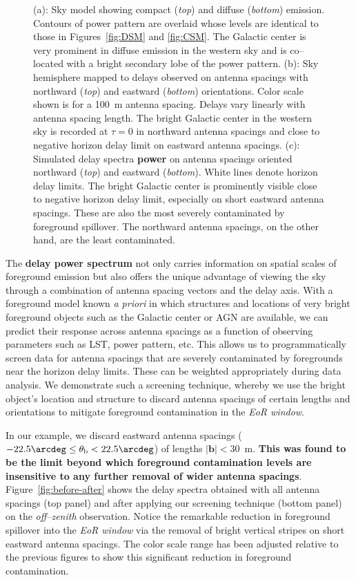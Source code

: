 \documentclass[preprint2,iop,numberedappendix]{emulateapj}
\begin{document}
\begin{figure}[htb]
\caption{(a): Sky model showing compact ({\it top}) and diffuse ({\it bottom}) emission. Contours of power pattern are overlaid whose levels are identical to those in Figures~\ref{fig:DSM} and \ref{fig:CSM}. The Galactic center is very prominent in diffuse emission in the western sky and is co--located with a bright secondary lobe of the power pattern. (b): Sky hemisphere mapped to delays observed on antenna spacings with northward ({\it top}) and eastward ({\it bottom}) orientations. Color scale shown is for a 100~m antenna spacing. Delays vary linearly with antenna spacing length. The bright Galactic center in the western sky is recorded at $\tau=0$ in northward antenna spacings and close to negative horizon delay limit on eastward antenna spacings. (c): Simulated delay spectra {\bf power} on antenna spacings oriented northward ({\it top}) and eastward ({\it bottom}). White lines denote horizon delay limits. The bright Galactic center is prominently visible close to negative horizon delay limit, especially on short eastward antenna spacings. These are also the most severely contaminated by foreground spillover. The northward antenna spacings, on the other hand, are the least contaminated.}
\label{fig:breakup}
\end{figure}

The {\bf delay power spectrum} not only carries information on spatial scales of foreground emission but also offers the unique advantage of viewing the sky through a combination of antenna spacing vectors and the delay axis. With a foreground model known {\it a priori} in which structures and locations of very bright foreground objects such as the Galactic center or AGN are available, we can predict their response across antenna spacings as a function of observing parameters such as LST, power pattern, etc. This allows us to programmatically screen data for antenna spacings that are severely contaminated by foregrounds near the horizon delay limits. These can be weighted appropriately during data analysis. We demonstrate such a screening technique, whereby we use the bright object's location and structure to discard antenna spacings of certain lengths and orientations to mitigate foreground contamination in the {\it EoR window}. 

In our example, we discard eastward antenna spacings ($-22.5\arcdeg\le\theta_\textrm{b}< 22.5\arcdeg$) of lengths $|\boldsymbol{b}| < 30$~m. {\bf This was found to be the limit beyond which foreground contamination levels are insensitive to any further removal of wider antenna spacings}. Figure~\ref{fig:before-after} shows the delay spectra obtained with all antenna spacings (top panel) and after applying our screening technique (bottom panel) on the {\it off--zenith} observation. Notice the remarkable reduction in foreground spillover into the {\it EoR window} via the removal of bright vertical stripes on short eastward antenna spacings. The color scale range has been adjusted relative to the previous figures to show this significant reduction in foreground contamination. 
\end{document}
